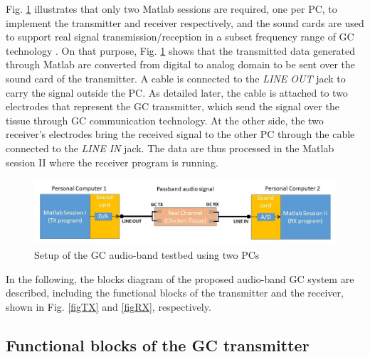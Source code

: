 Fig. \ref{figGCaudio} illustrates that only two Matlab sessions are required, one per PC, to implement the transmitter and receiver respectively, and the sound cards are used to support real signal transmission/reception in a subset frequency range of GC technology \cite{Callejon2014}. On that purpose, Fig. \ref{figGCaudio} shows that the transmitted data generated through Matlab are converted from digital to analog domain to be sent over the sound card of the transmitter. A cable is connected to the \emph{LINE OUT} jack to carry the signal outside the PC. As detailed later, the cable is attached to two electrodes that represent the GC transmitter, which send the signal over the tissue through GC communication technology. At the other side, the two receiver's electrodes bring the received signal to the other PC through the cable connected to the \emph{LINE IN} jack. The data are thus processed in the Matlab session II where the receiver program is running. 

\begin{figure}
	\includegraphics[width=\textwidth]{figures/GC_testbed/AUDIO.jpg}
	\caption{Setup of the GC audio-band testbed using two PCs} \label{figGCaudio}
\end{figure}

In the following, the blocks diagram of the proposed audio-band GC system are described, including the functional blocks of the transmitter and the receiver,  shown in Fig. \ref{figTX} and \ref{figRX}, respectively. 

\subsection{Functional blocks of the GC transmitter}




